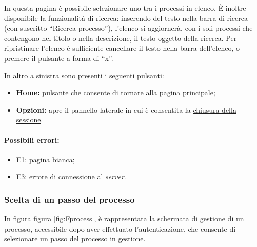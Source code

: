 In questa pagina è possibile selezionare uno tra i processi in elenco. È inoltre disponibile la funzionalità di ricerca: inserendo del testo nella barra di ricerca (con suscritto ``Ricerca processo''), l'elenco si aggiornerà, con i soli processi che contengono nel titolo o nella descrizione, il testo oggetto della ricerca.
Per ripristinare l'elenco è sufficiente cancellare il testo nella barra dell'elenco, o premere il pulsante a forma di ``x''.

In altro a sinistra sono presenti i seguenti pulsanti:
\begin{itemize}
\item \textbf{Home:} pulsante che consente di tornare alla \hyperref[home]{pagina principale};
\item \textbf{Opzioni:} apre il pannello laterale in cui è consentita la \hyperref[logout]{chiusura della sessione}.
\end{itemize}

\paragraph*{Possibili errori:}
\begin{itemize}
\item \hyperref[e1]{E1}: pagina bianca;
\item \hyperref[e3]{E3}: errore di connessione al \textit{server}.
\end{itemize}

\subsubsection{Scelta di un passo del processo}

In figura \hyperref[fig:Fprocess]{figura \ref{fig:Fprocess}}, è rappresentata la schermata di gestione di un processo, accessibile dopo aver effettuato l'autenticazione, che consente di selezionare un passo del processo in gestione.

